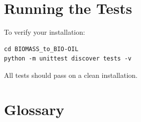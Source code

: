 \documentclass[11pt, a4paper]{article}
\begin{document}
\section{Running the Tests}

To verify your installation:

\begin{lstlisting}
cd BIOMASS_to_BIO-OIL
python -m unittest discover tests -v
\end{lstlisting}

All tests should pass on a clean installation.

\section*{Glossary}
\end{document}
